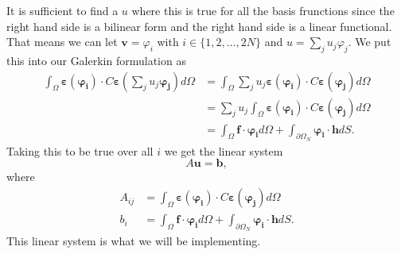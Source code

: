 \documentclass[paper=a4, fontsize=11pt]{scrartcl} %
\begin{document}
It is sufficient to find a $u$ where this is true for all the basis frunctions since the right hand side is a bilinear form and the right hand side is a linear functional. That means we can let $\boldsymbol{v} = \varphi_i$ with $i\in\{1,2,\ldots,2N\}$ and $u = \sum_j u_j\varphi_j$. We put this into our Galerkin formulation as
\begin{align*}
\int_{\Omega}\boldsymbol{\varepsilon}(\boldsymbol{\varphi_i})\cdot C\boldsymbol{\varepsilon}\left(\sum_j u_j\boldsymbol{\varphi_j}\right)d\Omega &= \int_{\Omega}\sum_j u_j\boldsymbol{\varepsilon}(\boldsymbol{\varphi_i})\cdot C\boldsymbol{\varepsilon}(\boldsymbol{\varphi_j})d\Omega \\
&=\sum_j u_j\int_{\Omega}\boldsymbol{\varepsilon}(\boldsymbol{\varphi_i})\cdot C\boldsymbol{\varepsilon}(\boldsymbol{\varphi_j})d\Omega \\
&= \int_{\Omega}\boldsymbol{f}\cdot \boldsymbol{\varphi_i} d\Omega + \int_{\partial \Omega_N}\boldsymbol{\varphi_i}\cdot\boldsymbol{h}dS.
\end{align*}
Taking this to be true over all $i$ we get the linear system
\begin{equation*}
A\boldsymbol{u} = \boldsymbol{b},
\end{equation*}
where
\begin{align*}
A_{ij} &= \int_{\Omega}\boldsymbol{\varepsilon}(\boldsymbol{\varphi_i})\cdot C\boldsymbol{\varepsilon}(\boldsymbol{\varphi_j})d\Omega \\
b_i &=  \int_{\Omega}\boldsymbol{f}\cdot \boldsymbol{\varphi_i} d\Omega + \int_{\partial \Omega_N}\boldsymbol{\varphi_i}\cdot\boldsymbol{h}dS.
\end{align*}
This linear system is what we will be implementing.
\end{document}

